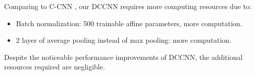 Comparing to C-CNN \cite{9053780}, our DCCNN requires more computing resources due to: 
\begin{itemize}
    \item Batch normalization: 500 trainable affine parameters, more computation.
    \item 2 layer of average pooling instead of max pooling: more computation. 
\end{itemize}

Despite the noticeable performance improvements of DCCNN, the additional resources required are negligible.